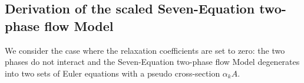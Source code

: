 \documentclass[preprint,10pt]{elsarticle}
\renewcommand{\div}{\mbold{\nabla}\! \cdot \!}
\newcommand{\mbold}[1]{\boldsymbol#1}
\newcommand{\sct}[1]{Section~\ref{#1}}                   %
\begin{document}
\subsection{Derivation of the scaled Seven-Equation two-phase flow Model}\label{sec:scaled-SEM}
We consider the case where the relaxation coefficients are set to zero:  
the two phases do not interact and the Seven-Equation two-phase flow Model degenerates into two sets of Euler equations with a pseudo cross-section $\alpha_k A$. 
\end{document}
